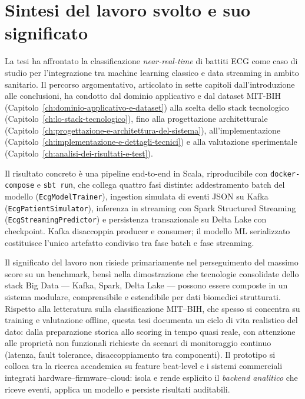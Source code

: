 \section{Sintesi del lavoro svolto e suo significato}\label{sec:sintesi-lavoro}

La tesi ha affrontato la classificazione \emph{near-real-time} di battiti ECG come caso di studio per l'integrazione tra machine learning classico e data streaming in ambito sanitario.
Il percorso argomentativo, articolato in sette capitoli dall'introduzione alle conclusioni, ha condotto dal dominio applicativo e dal dataset MIT-BIH (Capitolo~\ref{ch:dominio-applicativo-e-dataset}) alla scelta dello stack tecnologico (Capitolo~\ref{ch:lo-stack-tecnologico}), fino alla progettazione architetturale (Capitolo~\ref{ch:progettazione-e-architettura-del-sistema}), all'implementazione (Capitolo~\ref{ch:implementazione-e-dettagli-tecnici}) e alla valutazione sperimentale (Capitolo~\ref{ch:analisi-dei-risultati-e-test}).

Il risultato concreto è una pipeline end-to-end in Scala, riproducibile con \texttt{docker-compose} e \texttt{sbt run}, che collega quattro fasi distinte: addestramento batch del modello (\texttt{EcgModelTrainer}), ingestion simulata di eventi JSON su Kafka (\texttt{EcgPatientSimulator}), inferenza in streaming con Spark Structured Streaming (\texttt{EcgStreamingPredictor}) e persistenza transazionale su Delta Lake con checkpoint.
Kafka disaccoppia producer e consumer; il modello ML serializzato costituisce l'unico artefatto condiviso tra fase batch e fase streaming.

Il significato del lavoro non risiede primariamente nel perseguimento del massimo score su un benchmark, bensì nella dimostrazione che tecnologie consolidate dello stack Big Data --- Kafka, Spark, Delta Lake --- possono essere composte in un sistema modulare, comprensibile e estendibile per dati biomedici strutturati.
Rispetto alla letteratura sulla classificazione MIT--BIH, che spesso si concentra su training e valutazione offline, questa tesi documenta un ciclo di vita realistico del dato: dalla preparazione storica allo scoring in tempo quasi reale, con attenzione alle proprietà non funzionali richieste da scenari di monitoraggio continuo (latenza, fault tolerance, disaccoppiamento tra componenti).
Il prototipo si colloca tra la ricerca accademica su feature beat-level e i sistemi commerciali integrati hardware--firmware--cloud: isola e rende esplicito il \emph{backend analitico} che riceve eventi, applica un modello e persiste risultati auditabili.

